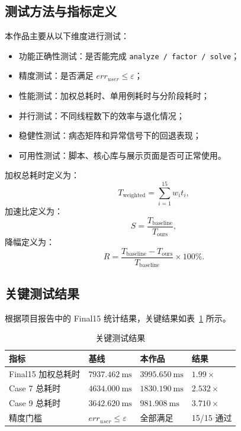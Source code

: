 \documentclass[12pt,a4paper,fontset=none]{ctexart}
\begin{document}
\subsection{测试方法与指标定义}

本作品主要从以下维度进行测试：
\begin{itemize}
  \item 功能正确性测试：是否能完成 \texttt{analyze / factor / solve}；
  \item 精度测试：是否满足 $err_{user}\le\varepsilon$；
  \item 性能测试：加权总耗时、单用例耗时与分阶段耗时；
  \item 并行测试：不同线程数下的效率与退化情况；
  \item 稳健性测试：病态矩阵和异常信号下的回退表现；
  \item 可用性测试：脚本、核心库与展示页面是否可正常使用。
\end{itemize}

加权总耗时定义为：
\begin{equation}
T_{\mathrm{weighted}}=\sum_{i=1}^{15} w_i t_i,
\end{equation}
加速比定义为：
\begin{equation}
S=\frac{T_{\mathrm{baseline}}}{T_{\mathrm{ours}}},
\end{equation}
降幅定义为：
\begin{equation}
R=\frac{T_{\mathrm{baseline}}-T_{\mathrm{ours}}}{T_{\mathrm{baseline}}}\times 100\%.
\end{equation}

\subsection{关键测试结果}

根据项目报告中的 Final15 统计结果，关键结果如表~\ref{tab:keyresult} 所示。

\begin{table}[H]
\centering
\caption{关键测试结果}
\label{tab:keyresult}
\begin{tabular}{p{5cm}p{3cm}p{3cm}p{2.5cm}}
\toprule
指标 & 基线 & 本作品 & 结果 \\
\midrule
Final15 加权总耗时 & $7937.462\ \mathrm{ms}$ & $3995.650\ \mathrm{ms}$ & $1.99\times$ \\
Case 7 总耗时 & $4634.000\ \mathrm{ms}$ & $1830.190\ \mathrm{ms}$ & $2.532\times$ \\
Case 9 总耗时 & $3642.620\ \mathrm{ms}$ & $981.908\ \mathrm{ms}$ & $3.710\times$ \\
精度门槛 & $err_{user}\le\varepsilon$ & 全部满足 & 15/15 通过 \\
\bottomrule
\end{tabular}
\end{table}
\end{document}
